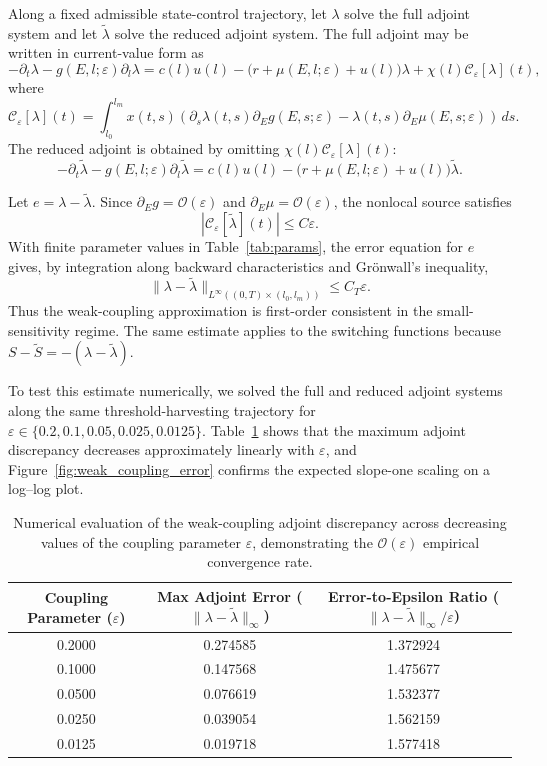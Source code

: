 \documentclass[pdflatex,sn-mathphys-num]{sn-jnl}
\theoremstyle{thmstyleone}
\theoremstyle{definition}
\theoremstyle{remark}
\begin{document}
Along a fixed admissible state-control trajectory, let \(\lambda\) solve the
full adjoint system and let \(\tilde\lambda\) solve the reduced adjoint system.
The full adjoint may be written in current-value form as
\[
-\partial_t \lambda
-
g(E,l;\varepsilon)\partial_l\lambda
=
c(l)u(l)
-
\bigl(r+\mu(E,l;\varepsilon)+u(l)\bigr)\lambda
+
\chi(l)\mathcal C_\varepsilon[\lambda](t),
\]
where
\[
\mathcal C_\varepsilon[\lambda](t)
=
\int_{l_0}^{l_m}
x(t,s)
\left(
\partial_s\lambda(t,s)\partial_E g(E,s;\varepsilon)
-
\lambda(t,s)\partial_E\mu(E,s;\varepsilon)
\right)\,ds .
\]
The reduced adjoint is obtained by omitting
\(\chi(l)\mathcal C_\varepsilon[\lambda](t)\):
\[
-\partial_t \tilde{\lambda}
-
g(E,l;\varepsilon)\partial_l\tilde{\lambda}
=
c(l)u(l)
-
\bigl(r+\mu(E,l;\varepsilon)+u(l)\bigr)\tilde{\lambda}.
\]

Let \(e=\lambda-\tilde\lambda\). Since
\(\partial_E g=\mathcal O(\varepsilon)\) and \(\partial_E\mu=\mathcal O(\varepsilon)\), the
nonlocal source satisfies
\[
|\mathcal C_\varepsilon[\tilde\lambda](t)|
\le C\varepsilon .
\]
With finite parameter values in Table~\ref{tab:params}, the error
equation for \(e\) gives, by integration along backward characteristics and
Gr\"onwall's inequality,
\[
\|\lambda-\tilde\lambda\|_{L^\infty((0,T)\times(l_0,l_m))}
\le C_T\varepsilon .
\]
Thus the weak-coupling approximation is first-order consistent in the
small-sensitivity regime. The same estimate applies to the switching functions
because \(S-\tilde S=-(\lambda-\tilde\lambda)\).

To test this estimate numerically, we solved the full and reduced adjoint
systems along the same threshold-harvesting trajectory for
\(\varepsilon\in\{0.2,0.1,0.05,0.025,0.0125\}\). Table~\ref{tab:weak_coupling_error}
shows that the maximum adjoint discrepancy decreases approximately linearly
with \(\varepsilon\), and Figure~\ref{fig:weak_coupling_error} confirms the
expected slope-one scaling on a log--log plot.

\begin{table}[htbp]
\centering
\caption{Numerical evaluation of the weak-coupling adjoint discrepancy across decreasing values of the coupling parameter $\varepsilon$, demonstrating the $\mathcal O(\varepsilon)$ empirical convergence rate.}
\label{tab:weak_coupling_error}
\begin{tabular}{ccc}
\hline
\textbf{Coupling Parameter} ($\varepsilon$) & \textbf{Max Adjoint Error} ($\|\lambda - \tilde{\lambda}\|_{\infty}$) & \textbf{Error-to-Epsilon Ratio} ($\|\lambda - \tilde{\lambda}\|_{\infty} / \varepsilon$) \\ \hline
0.2000 & 0.274585 & 1.372924 \\
0.1000 & 0.147568 & 1.475677 \\
0.0500 & 0.076619 & 1.532377 \\
0.0250 & 0.039054 & 1.562159 \\
0.0125 & 0.019718 & 1.577418 \\ \hline
\end{tabular}
\end{table}
\end{document}
